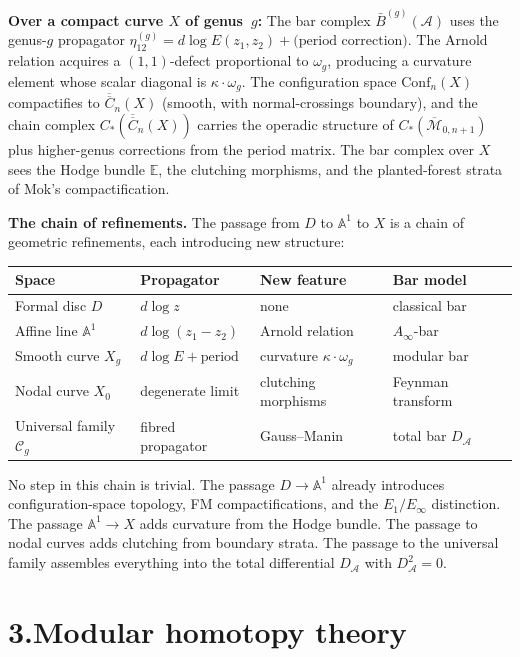\documentclass[11pt,reqno]{amsart}
\theoremstyle{definition}
\theoremstyle{remark}
\providecommand{\cA}{\mathcal{A}}
\providecommand{\cC}{\mathcal{C}}
\providecommand{\cM}{\mathcal{M}}
\providecommand{\barB}{\bar{B}}
\providecommand{\FM}{\overline{C}}
\providecommand{\bA}{\mathbb{A}}
\providecommand{\Conf}{\mathrm{Conf}}
\numberwithin{equation}{section}
\begin{document}
\medskip
\noindent\textbf{Over a compact curve $X$ of genus~$g$:}\enspace
The bar complex $\barB^{(g)}(\cA)$ uses the genus-$g$ propagator
$\eta^{(g)}_{12}=d\log E(z_1,z_2)+\text{(period correction)}$.
The Arnold relation acquires a $(1,1)$-defect proportional to
$\omega_g$, producing a curvature element whose scalar diagonal is
$\kappa\cdot\omega_g$.
The configuration space $\Conf_n(X)$ compactifies to
$\overline{\FM}_n(X)$ (smooth, with normal-crossings boundary), and
the chain complex $C_*(\overline{\FM}_n(X))$ carries the operadic
structure of $C_*(\overline{\cM}_{0,n+1})$ plus higher-genus
corrections from the period matrix. The bar complex over $X$ sees
the Hodge bundle $\mathbb E$, the clutching morphisms, and the
planted-forest strata of Mok's compactification.

\medskip
\noindent\textbf{The chain of refinements.}\enspace
The passage from $D$ to $\bA^1$ to $X$ is a chain of geometric
refinements, each introducing new structure:
\begin{center}
\small
\renewcommand{\arraystretch}{1.15}
\begin{tabular}{llll}
\textbf{Space} & \textbf{Propagator} & \textbf{New feature} & \textbf{Bar model}\\
\hline
Formal disc $D$ & $d\log z$ & none & classical bar\\
Affine line $\bA^1$ & $d\log(z_1{-}z_2)$ & Arnold relation & $A_\infty$-bar\\
Smooth curve $X_g$ & $d\log E+\text{period}$ & curvature $\kappa\cdot\omega_g$ & modular bar\\
Nodal curve $X_0$ & degenerate limit & clutching morphisms & Feynman transform\\
Universal family $\cC_g$ & fibred propagator & Gauss--Manin & total bar $D_\cA$
\end{tabular}
\end{center}
No step in this chain is trivial. The passage $D\to\bA^1$ already
introduces configuration-space topology, FM compactifications, and
the $E_1/E_\infty$ distinction. The passage $\bA^1\to X$ adds
curvature from the Hodge bundle. The passage to nodal curves adds
clutching from boundary strata. The passage to the universal family
assembles everything into the total differential $D_\cA$ with
$D_\cA^2=0$.


\section*{3.\quad Modular homotopy theory}
\end{document}
